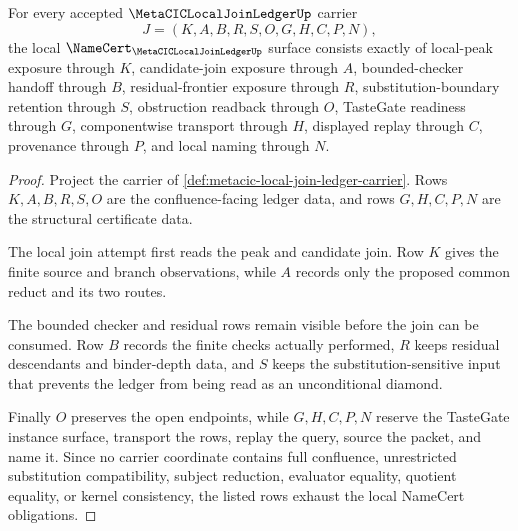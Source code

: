 \begin{theorem}
\label{thm:metacic-local-join-ledger-obligations}
For every accepted $\MetaCICLocalJoinLedgerUp$ carrier
$$
J=(K,A,B,R,S,O,G,H,C,P,N),
$$
the local $\NameCert_{\MetaCICLocalJoinLedgerUp}$ surface consists exactly of local-peak exposure through $K$, candidate-join exposure through $A$, bounded-checker handoff through $B$, residual-frontier exposure through $R$, substitution-boundary retention through $S$, obstruction readback through $O$, TasteGate readiness through $G$, componentwise transport through $H$, displayed replay through $C$, provenance through $P$, and local naming through $N$.
\end{theorem}
\begin{proof}
Project the carrier of \autoref{def:metacic-local-join-ledger-carrier}. Rows $K,A,B,R,S,O$ are the confluence-facing ledger data, and rows $G,H,C,P,N$ are the structural certificate data.

The local join attempt first reads the peak and candidate join. Row $K$ gives the finite source and branch observations, while $A$ records only the proposed common reduct and its two routes.

The bounded checker and residual rows remain visible before the join can be consumed. Row $B$ records the finite checks actually performed, $R$ keeps residual descendants and binder-depth data, and $S$ keeps the substitution-sensitive input that prevents the ledger from being read as an unconditional diamond.

Finally $O$ preserves the open endpoints, while $G,H,C,P,N$ reserve the TasteGate instance surface, transport the rows, replay the query, source the packet, and name it. Since no carrier coordinate contains full confluence, unrestricted substitution compatibility, subject reduction, evaluator equality, quotient equality, or kernel consistency, the listed rows exhaust the local NameCert obligations.
\end{proof}

